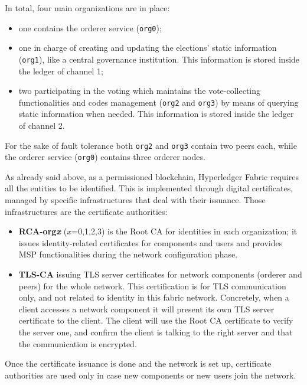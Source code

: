 \documentclass{scrartcl}
\begin{document}
In total, four main organizations are in place:
\begin{itemize}
    \item one contains the orderer service (\texttt{org0});
    \item one in charge of creating and updating the elections' static information (\texttt{org1}), like a central governance institution. This information is stored inside the ledger of channel 1;
    \item two participating in the voting which maintains the vote-collecting functionalities and codes management (\texttt{org2} and \texttt{org3}) by means of querying static information when needed. This information is stored inside the ledger of channel 2.
\end{itemize} 

For the sake of fault tolerance both \texttt{org2} and \texttt{org3} contain two peers each, while the orderer service (\texttt{org0}) contains three orderer nodes.

As already said above, as a permissioned blockchain, Hyperledger Fabric requires all the entities to be identified. This is implemented through digital certificates, managed by specific infrastructures that deal with their issuance.
Those infrastructures are the certificate authorities:

\begin{itemize}
    \item \textbf{RCA-org\emph{x}} ($x$=0,1,2,3) is the Root CA for identities in each organization; it issues identity-related certificates for components and users and provides MSP functionalities during the network configuration phase.
    \item \textbf{TLS-CA} issuing TLS server certificates for network components (orderer and peers) for the whole network. This certification is for TLS communication only, and not related to identity in this fabric network. Concretely, when a client accesses a network component it will present its own TLS server certificate to the client. The client will use the Root CA certificate to verify the server one, and confirm the client is talking to the right server and that the communication is encrypted.
\end{itemize}

Once the certificate issuance is done and the network is set up, certificate authorities are used only in case new components or new users join the network.
\end{document}
